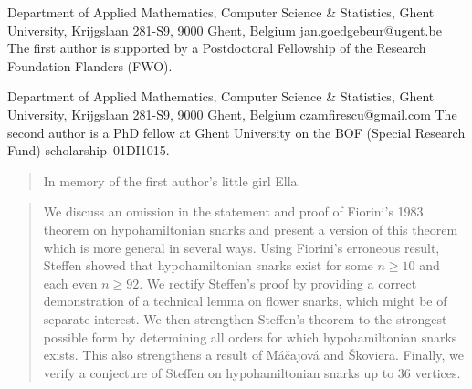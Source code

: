 \documentclass{amcjoucc}
\newenvironment{dedication}
{\begin{quotation}\begin{center}\begin{em}}
{\end{em}\end{center}\end{quotation}}
\begin{document}
\begin{frontmatter}   %


{Department of Applied Mathematics, Computer Science \& Statistics, Ghent University, Krijgslaan 281-S9, 9000 Ghent, Belgium}    %
{jan.goedgebeur@ugent.be}                     %
{The first author is supported by a Postdoctoral Fellowship of the Research Foundation Flanders (FWO).}          %

{Department of Applied Mathematics, Computer Science \& Statistics, Ghent University, Krijgslaan 281-S9, 9000 Ghent, Belgium}    %
{czamfirescu@gmail.com}
{The second author is a PhD fellow at Ghent University on the BOF (Special Research Fund) scholarship~01DI1015.}                                       %




\begin{dedication}
In memory of the first author's little girl Ella.
\end{dedication}

\begin{abstract}
We discuss an omission in the statement and proof of Fiorini's 1983 theorem on hypohamiltonian snarks and present a version of this theorem which is more general in several ways. Using Fiorini's erroneous result, Steffen showed that hypohamiltonian snarks exist for some $n \ge 10$ and each even $n \ge 92$. We rectify Steffen's proof by providing a correct demonstration of a technical lemma on flower snarks, which might be of separate interest. We then strengthen Steffen's theorem to the strongest possible form by determining all orders for which hypohamiltonian snarks exists. This also strengthens a result of M\'{a}\v{c}ajov\'{a} and \v{S}koviera. Finally, we verify a conjecture of Steffen on hypohamiltonian snarks up to 36 vertices.
\end{abstract}

\end{frontmatter}   %
\end{document}
